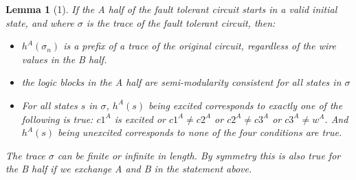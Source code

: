 \documentclass[12pt]{report}
\newtheorem*{lemma}{Lemma}
\begin{document}
\begin{lemma}[1]
If the A half of the fault tolerant circuit starts in a valid initial state, and where $\sigma$ is the trace of the fault tolerant circuit, then:
\begin{itemize}
\item  $h^{A}(\sigma_n)$ is a prefix of a trace of the original circuit, regardless of the wire values in the B half.
\item the logic blocks in the A half are semi-modularity consistent for all states in $\sigma$
\item For all states $s$ in $\sigma$, $h^A(s)$ being excited corresponds to exactly one of the following is true: $c1^A$ is excited or $c1^{A}\neq c2^{A}$ or $c2^{A}\neq c3^A$ or $c3^{A}\neq w^A$.  And $h^A(s)$ being unexcited corresponds to none of the four conditions are true.
\end{itemize}

The trace $\sigma$ can be finite or infinite in length.  
By symmetry this is also true for the B half if we exchange A and B in the statement above.


\end{lemma}
\end{document}
